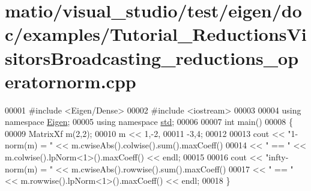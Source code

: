 \hypertarget{matio_2visual__studio_2test_2eigen_2doc_2examples_2_tutorial___reductions_visitors_broadcasting__reductions__operatornorm_8cpp_source}{}\section{matio/visual\+\_\+studio/test/eigen/doc/examples/\+Tutorial\+\_\+\+Reductions\+Visitors\+Broadcasting\+\_\+reductions\+\_\+operatornorm.cpp}
\label{matio_2visual__studio_2test_2eigen_2doc_2examples_2_tutorial___reductions_visitors_broadcasting__reductions__operatornorm_8cpp_source}

\begin{DoxyCode}
00001 \textcolor{preprocessor}{#include <Eigen/Dense>}
00002 \textcolor{preprocessor}{#include <iostream>}
00003 
00004 \textcolor{keyword}{using namespace }\hyperlink{namespace_eigen}{Eigen};
00005 \textcolor{keyword}{using namespace }\hyperlink{namespacestd}{std};
00006 
00007 \textcolor{keywordtype}{int} main()
00008 \{
00009   MatrixXf m(2,2);
00010   m << 1,-2,
00011        -3,4;
00012 
00013   cout << \textcolor{stringliteral}{"1-norm(m)     = "} << m.cwiseAbs().colwise().sum().maxCoeff()
00014        << \textcolor{stringliteral}{" == "}             << m.colwise().lpNorm<1>().maxCoeff() << endl;
00015 
00016   cout << \textcolor{stringliteral}{"infty-norm(m) = "} << m.cwiseAbs().rowwise().sum().maxCoeff()
00017        << \textcolor{stringliteral}{" == "}             << m.rowwise().lpNorm<1>().maxCoeff() << endl;
00018 \}
\end{DoxyCode}
